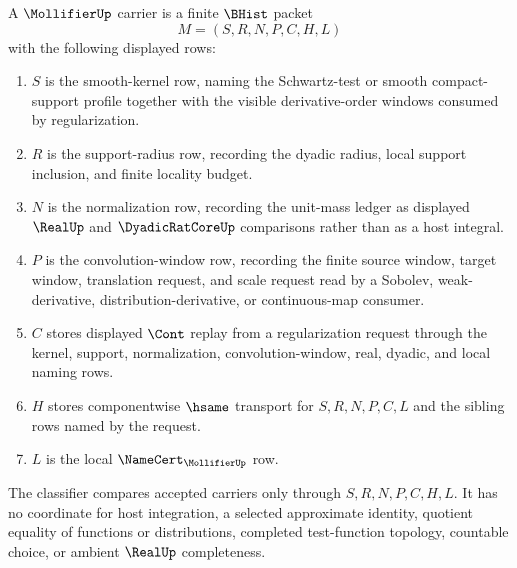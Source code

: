 \begin{definition}
\label{def:mollifier-carrier}
A $\MollifierUp$ carrier is a finite $\BHist$ packet
$$
M=(S,R,N,P,C,H,L)
$$
with the following displayed rows:
\begin{enumerate}
\item $S$ is the smooth-kernel row, naming the Schwartz-test or smooth compact-support profile together with the visible derivative-order windows consumed by regularization.
\item $R$ is the support-radius row, recording the dyadic radius, local support inclusion, and finite locality budget.
\item $N$ is the normalization row, recording the unit-mass ledger as displayed $\RealUp$ and $\DyadicRatCoreUp$ comparisons rather than as a host integral.
\item $P$ is the convolution-window row, recording the finite source window, target window, translation request, and scale request read by a Sobolev, weak-derivative, distribution-derivative, or continuous-map consumer.
\item $C$ stores displayed $\Cont$ replay from a regularization request through the kernel, support, normalization, convolution-window, real, dyadic, and local naming rows.
\item $H$ stores componentwise $\hsame$ transport for $S,R,N,P,C,L$ and the sibling rows named by the request.
\item $L$ is the local $\NameCert_{\MollifierUp}$ row.
\end{enumerate}
The classifier compares accepted carriers only through $S,R,N,P,C,H,L$. It has no coordinate for host integration, a selected approximate identity, quotient equality of functions or distributions, completed test-function topology, countable choice, or ambient $\RealUp$ completeness.
\end{definition}

